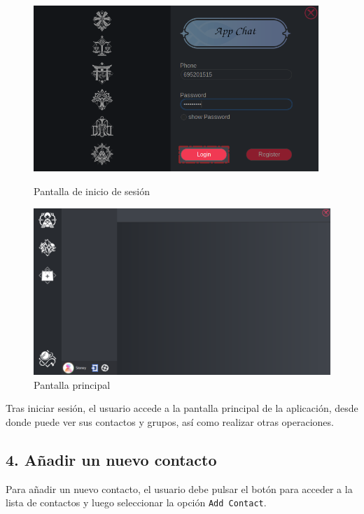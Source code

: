 \begin{figure}[H]
    \centering
    \begin{minipage}[b]{0.48\textwidth}
        \centering
        \includegraphics[width=0.96\textwidth]{images/manualDeUsuario/InicioSesion1.png}
        \caption*{Pantalla de inicio de sesión}
    \end{minipage}
    \hfill
    \begin{minipage}[b]{0.48\textwidth}
        \centering
        \includegraphics[width=\textwidth]{images/manualDeUsuario/InicioSesion2.png}
        \caption*{Pantalla principal}
    \end{minipage}
\end{figure}

Tras iniciar sesión, el usuario accede a la pantalla principal de la aplicación, desde donde puede ver sus contactos y grupos, así como realizar otras operaciones.

\subsection*{4. Añadir un nuevo contacto}
Para añadir un nuevo contacto, el usuario debe pulsar el botón para acceder a la lista de contactos y luego seleccionar la opción \texttt{Add Contact}. 

